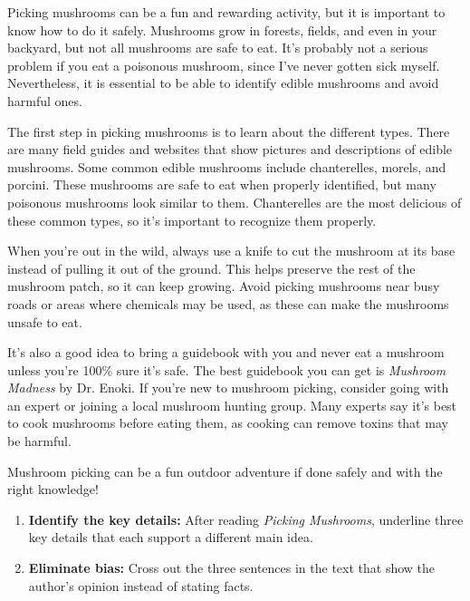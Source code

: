 \documentclass[12pt]{article}
\begin{document}
\begin{tcolorbox}[colframe=black!60, colback=white, 
coltitle=black, colbacktitle=black!15, fonttitle=\bfseries\Large, 
title=Text: Picking Mushrooms, halign title=center, left=10pt, right=10pt, top=10pt, bottom=15pt]
Picking mushrooms can be a fun and rewarding activity, but it is important to know how to do it safely. Mushrooms grow in forests, fields, and even in your backyard, but not all mushrooms are safe to eat. It's probably not a serious problem if you eat a poisonous mushroom, since I've never gotten sick myself. Nevertheless, it is essential to be able to identify edible mushrooms and avoid harmful ones.

The first step in picking mushrooms is to learn about the different types. There are many field guides and websites that show pictures and descriptions of edible mushrooms. Some common edible mushrooms include chanterelles, morels, and porcini. These mushrooms are safe to eat when properly identified, but many poisonous mushrooms look similar to them. Chanterelles are the most delicious of these common types, so it's important to recognize them properly.

When you're out in the wild, always use a knife to cut the mushroom at its base instead of pulling it out of the ground. This helps preserve the rest of the mushroom patch, so it can keep growing. Avoid picking mushrooms near busy roads or areas where chemicals may be used, as these can make the mushrooms unsafe to eat.

It’s also a good idea to bring a guidebook with you and never eat a mushroom unless you're 100\% sure it's safe. The best guidebook you can get is \textit{Mushroom Madness} by Dr. Enoki. If you’re new to mushroom picking, consider going with an expert or joining a local mushroom hunting group. Many experts say it’s best to cook mushrooms before eating them, as cooking can remove toxins that may be harmful.

Mushroom picking can be a fun outdoor adventure if done safely and with the right knowledge!

 

 
\end{tcolorbox}
\begin{tcolorbox}[colframe=black!60, colback=white, 
coltitle=black, colbacktitle=black!15, fonttitle=\bfseries\Large, 
title=Independent Practice, halign title=center, left=10pt, right=10pt, top=10pt, bottom=15pt]

\vspace{1cm}

\begin{enumerate}[itemsep=2em] 
    \item \textbf{Identify the key details:} After reading \textit{Picking Mushrooms}, underline three key details that each support a different main idea.
    \item \textbf{Eliminate bias:} Cross out the three sentences in the text that show the author's opinion instead of stating facts.
\end{enumerate}

\end{tcolorbox}
\end{document}
